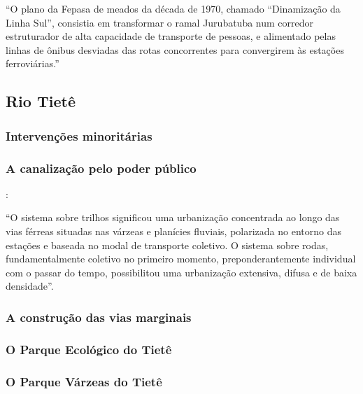 \documentclass[
article,			%
11pt,				%
oneside,			%
a4paper,			%
english,			%
brazil,				%
sumario=tradicional
]{abntex2}
\begin{document}
	\begin{citacao}
		``O plano da Fepasa de meados da década de 1970, chamado ``Dinamização da Linha Sul'', consistia em transformar o ramal Jurubatuba num corredor estruturador de alta capacidade de transporte de pessoas, e alimentado pelas linhas de ônibus desviadas das rotas concorrentes para convergirem às estações ferroviárias.'' \cite[p.143]{requena2016a}
	\end{citacao}
	
	\subsection{Rio Tietê} \label{s2:riotiete}
	
	\subsubsection{Intervenções minoritárias} \label{s3:minoritariastiete}
	
	\subsubsection{A canalização pelo poder público} \label{s3:canalizacaopub}
	
	:
	
	\begin{citacao}
		``O sistema sobre trilhos significou uma urbanização concentrada ao longo das vias férreas situadas nas várzeas e planícies fluviais, polarizada no entorno das estações e baseada no modal de transporte coletivo. O sistema sobre rodas, fundamentalmente coletivo no primeiro momento, preponderantemente individual com o passar do tempo, possibilitou uma urbanização extensiva, difusa e de baixa densidade''.
	\end{citacao}
	
	\subsubsection{A construção das vias marginais} \label{s3:marginaltiete}
	
	\subsubsection{O Parque Ecológico do Tietê} \label{s3:pet}
	
	\subsubsection{O Parque Várzeas do Tietê} \label{s3:pvt}
	
\end{document}
